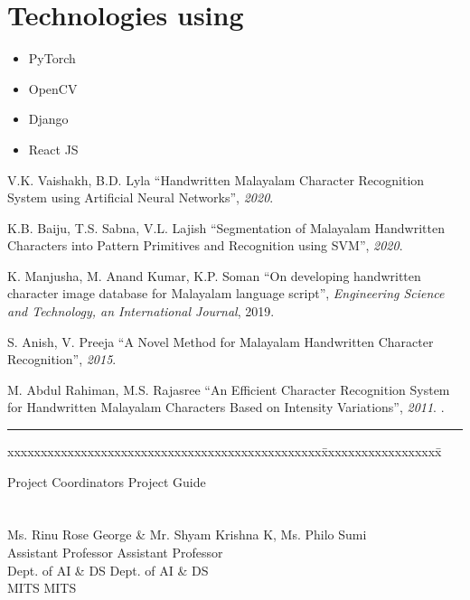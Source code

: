 \documentclass{article}
\begin{document}
\section{Technologies using}
\begin{itemize}
    \item PyTorch
    \item OpenCV
    \item Django
    \item React JS
\end{itemize}

	

\begin{thebibliography}{999}

 V.K. Vaishakh, B.D. Lyla \textquotedblleft Handwritten Malayalam Character Recognition System using Artificial Neural Networks\textquotedblright, \textit{2020}.  

 K.B. Baiju, T.S. Sabna, V.L. Lajish \textquotedblleft Segmentation of Malayalam Handwritten Characters into Pattern Primitives and Recognition using SVM\textquotedblright, \textit{2020}.  

 K. Manjusha, M. Anand Kumar, K.P. Soman \textquotedblleft On developing handwritten character image database for Malayalam language script\textquotedblright, \textit{Engineering Science and Technology, an International Journal}, 2019.  

 S. Anish, V. Preeja \textquotedblleft A Novel Method for Malayalam Handwritten Character Recognition\textquotedblright, \textit{2015}.  

 M. Abdul Rahiman, M.S. Rajasree \textquotedblleft An Efficient Character Recognition System for Handwritten Malayalam Characters Based on Intensity Variations\textquotedblright, \textit{2011}.  
.



\end{thebibliography}
\vspace{0.2in}
\hrule
\vspace{.3in}

\hspace{-.25in}
\begin{tabbing}
xxxxxxxxxxxxxxxxxxxxxxxxxxxxxxxxxxxxxxxxxxxxxxx\= xxxxxxxxxxxxxxxxxx\= \kill

Project Coordinators \>\>\>\> Project Guide
\\
\\
\\
Ms. Rinu Rose George \& Mr. Shyam Krishna K, \>\> Ms.  Philo Sumi \\
Assistant Professor \>\> Assistant Professor\\
Dept. of AI \& DS \>\> Dept. of AI \& DS\\
MITS \>\> MITS
\end{tabbing}
\end{document}
